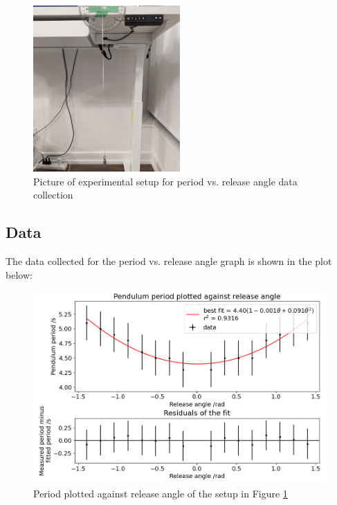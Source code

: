 \documentclass[12pt]{article}
\begin{document}
\begin{figure}[!hptb]
    \centering
    \includegraphics[width=0.5\textwidth]{../figures/exp_setup1.jpg}
    \caption{\centering Picture of experimental setup for period vs. release angle data collection}
    \label{fig:figure 1}
\end{figure}

\newpage

\subsection{Data}
The data collected for the period vs. release angle graph is shown in the plot below:

\begin{figure}[!hptb]
    \centering
    \includegraphics[width=\textwidth]{../figures/period_vs_release_angle.png}
    \caption{\centering Period plotted against release angle of the setup in Figure \ref{fig:figure 1}}
    \label{fig:figure 2}
\end{figure}
\end{document}
